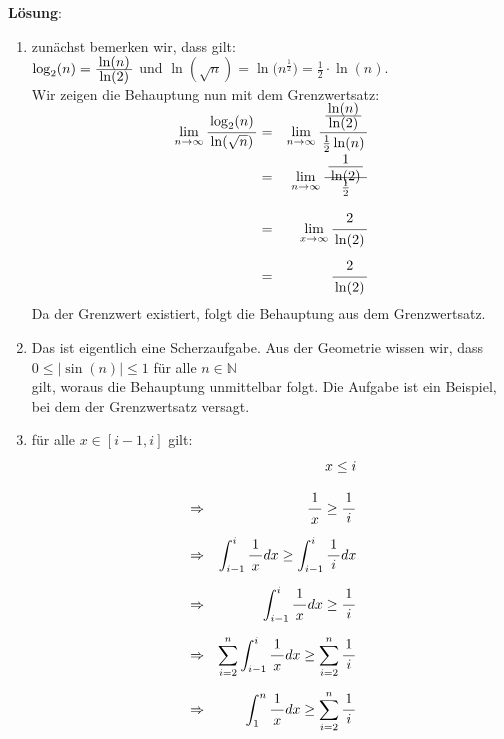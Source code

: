 \documentclass{article}
\newcommand{\bruch}[2]{\frac{\displaystyle \raisebox{1pt}[0pt][-0pt]{$\,#1\,$}}{\displaystyle \raisebox{0pt}[9pt]{$\,#2\,$}}}
\begin{document}
\textbf{L\"osung}:
\begin{enumerate}
\item zun\"achst bemerken wir, dass gilt:
      \\[0.2cm]
      \hspace*{1.3cm}
      $\log_2(n) = \bruch{\ln(n)}{\ln(2)}$ \quad und \quad
      $\ln(\sqrt{n}) = \ln\bigl(n^\frac{1}{2}\bigr) = \frac{1}{2} \cdot \ln(n)$.
      \\[0.2cm]
      Wir zeigen die Behauptung nun mit dem Grenzwertsatz:
      \begin{eqnarray*}
              \lim\limits_{n \rightarrow \infty} \bruch{\log_2(n)}{\ln(\sqrt{n})}
        & = & \lim\limits_{n \rightarrow \infty} \bruch{\bruch{\ln(n)}{\ln(2)}}{\frac{1}{2}\ln(n)} \\[0.3cm]
        & = & \lim\limits_{n \rightarrow \infty} \bruch{\bruch{1}{\ln(2)}}{\frac{1}{2}} \\[0.3cm]
        & = & \lim\limits_{x \rightarrow \infty} \bruch{2}{\ln(2)} \\[0.2cm]
        & = & \bruch{2}{\ln(2)} 
      \end{eqnarray*}
      Da der Grenzwert existiert, folgt die Behauptung aus dem Grenzwertsatz.
\item Das ist eigentlich eine Scherzaufgabe.  Aus der Geometrie wissen wir, dass 
      \\[0.2cm]
      \hspace*{1.3cm}
      $0 \leq | \sin(n) | \leq 1$ \quad f\"ur alle $n \in \mathbb{N}$ 
      \\[0.2cm]
      gilt, woraus die Behauptung unmittelbar folgt.  Die Aufgabe ist ein Beispiel, bei dem
      der Grenzwertsatz versagt.
\item f\"ur alle $x \in [i-1,i]$ gilt:
      \begin{eqnarray*}
      &             & x \leq i \\[0.3cm]
      & \Rightarrow & \bruch{1}{x} \geq \bruch{1}{i} \\[0.2cm]
      & \Rightarrow & \int_{i-1}^i \bruch{1}{x} dx \geq \int_{i-1}^i \bruch{1}{i} dx \\[0.2cm]
      & \Rightarrow & \int_{i-1}^i \bruch{1}{x} dx \geq \bruch{1}{i} \\[0.2cm]
      & \Rightarrow & \sum\limits_{i=2}^{n} \int_{i-1}^i \bruch{1}{x} dx \geq 
                      \sum\limits_{i=2}^{n} \bruch{1}{i}                      \\[0.2cm]
      & \Rightarrow & \int_{1}^n \bruch{1}{x} dx \geq \sum\limits_{i=2}^{n} \bruch{1}{i} \\[0.2cm]

\end{eqnarray*}
\end{enumerate}
\end{document}
